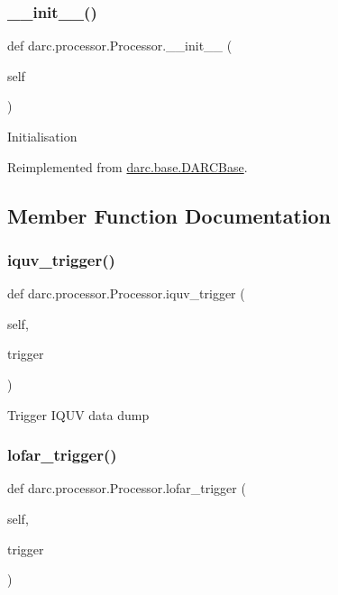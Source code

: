 \subsubsection{\texorpdfstring{\_\_init\_\_()}{\_\_init\_\_()}}
{\footnotesize\ttfamily def darc.\+processor.\+Processor.\+\_\+\+\_\+init\+\_\+\+\_\+ (\begin{DoxyParamCaption}\item[{}]{self }\end{DoxyParamCaption})}

\begin{DoxyVerb}Initialisation
\end{DoxyVerb}
 

Reimplemented from \mbox{\hyperlink{classdarc_1_1base_1_1_d_a_r_c_base_ac14d433a0b0c403939d6a2f8271f56b4}{darc.\+base.\+D\+A\+R\+C\+Base}}.



\subsection{Member Function Documentation}
\mbox{\label{classdarc_1_1processor_1_1_processor_ad24fbca252f0ca5d8da55a10fe33c35b}} 
\subsubsection{\texorpdfstring{iquv\_trigger()}{iquv\_trigger()}}
{\footnotesize\ttfamily def darc.\+processor.\+Processor.\+iquv\+\_\+trigger (\begin{DoxyParamCaption}\item[{}]{self,  }\item[{}]{trigger }\end{DoxyParamCaption})}

\begin{DoxyVerb}Trigger IQUV data dump
\end{DoxyVerb}
 \mbox{\label{classdarc_1_1processor_1_1_processor_ac131c76f45db46cf716097ea232c7401}} 
\subsubsection{\texorpdfstring{lofar\_trigger()}{lofar\_trigger()}}
{\footnotesize\ttfamily def darc.\+processor.\+Processor.\+lofar\+\_\+trigger (\begin{DoxyParamCaption}\item[{}]{self,  }\item[{}]{trigger }\end{DoxyParamCaption})}

